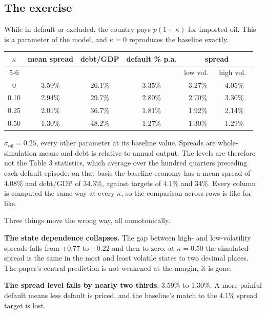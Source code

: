 \subsection*{The exercise}

While in default or excluded, the country pays $p(1+\kappa)$ for imported oil.
This is a parameter of the model, and $\kappa = 0$ reproduces the baseline
exactly.

\begin{table}[h]
\centering\footnotesize
\setlength{\tabcolsep}{5pt}
\begin{tabular}{cccccc}
\toprule
$\kappa$ & mean spread & debt/GDP & default \% p.a. & \multicolumn{2}{c}{spread} \\
\cmidrule(lr){5-6}
         &             &          &                 & low vol.\ & high vol.\ \\
\midrule
0    & 3.59\% & 26.1\% & 3.35\% & 3.27\% & 4.05\% \\
0.10 & 2.94\% & 29.7\% & 2.80\% & 2.70\% & 3.30\% \\
0.25 & 2.01\% & 36.7\% & 1.81\% & 1.92\% & 2.14\% \\
0.50 & 1.30\% & 48.2\% & 1.27\% & 1.30\% & 1.29\% \\
\bottomrule
\end{tabular}
\end{table}

\noindent
$\sigma_{\text{oil}} = 0.25$, every other parameter at its baseline value.
Spreads are whole-simulation means and debt is relative to annual output. The
levels are therefore not the Table 3 statistics, which average over the hundred
quarters preceding each default episode: on that basis the baseline
economy has a mean spread of 4.08\% and debt/GDP of 34.3\%, against targets of
4.1\% and 34\%. Every column is computed the same way at every $\kappa$, so the
comparison across rows is like for like.

Three things move the wrong way, all monotonically.

\textbf{The state dependence collapses.} The gap between high- and
low-volatility spreads falls from $+0.77$ to $+0.22$ and then to zero: at
$\kappa = 0.50$ the simulated spread is the same in the most and least volatile
states to two decimal places. The paper's central prediction is not weakened at
the margin, it is gone.

\textbf{The spread level falls by nearly two thirds}, 3.59\% to 1.30\%. A
more painful default means less default is priced, and the baseline's match to
the 4.1\% spread target is lost.

